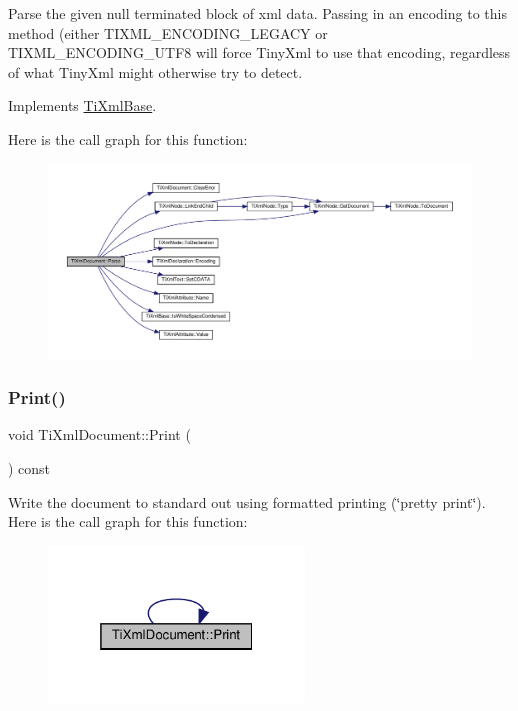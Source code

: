 Parse the given null terminated block of xml data. Passing in an encoding to this method (either T\+I\+X\+M\+L\+\_\+\+E\+N\+C\+O\+D\+I\+N\+G\+\_\+\+L\+E\+G\+A\+CY or T\+I\+X\+M\+L\+\_\+\+E\+N\+C\+O\+D\+I\+N\+G\+\_\+\+U\+T\+F8 will force Tiny\+Xml to use that encoding, regardless of what Tiny\+Xml might otherwise try to detect. 

Implements \hyperlink{classTiXmlBase}{Ti\+Xml\+Base}.

Here is the call graph for this function\+:
\nopagebreak
\begin{figure}[H]
\begin{center}
\leavevmode
\includegraphics[width=350pt]{classTiXmlDocument_a789ad2f06f93d52bdb5570b2f3670289_cgraph}
\end{center}
\end{figure}
\mbox{\label{classTiXmlDocument_aa4e8c1498a76dcde7191c683e1220882}} 
\subsubsection{\texorpdfstring{Print()}{Print()}}
{\footnotesize\ttfamily void Ti\+Xml\+Document\+::\+Print (\begin{DoxyParamCaption}{ }\end{DoxyParamCaption}) const\hspace{0.3cm}{\ttfamily [inline]}}

Write the document to standard out using formatted printing (\char`\"{}pretty print\char`\"{}). Here is the call graph for this function\+:
\nopagebreak
\begin{figure}[H]
\begin{center}
\leavevmode
\includegraphics[width=193pt]{classTiXmlDocument_aa4e8c1498a76dcde7191c683e1220882_cgraph}
\end{center}
\end{figure}
\mbox{\label{classTiXmlDocument_ab54e3a93279fcf0ac80f06ed9c52f04a}} 
